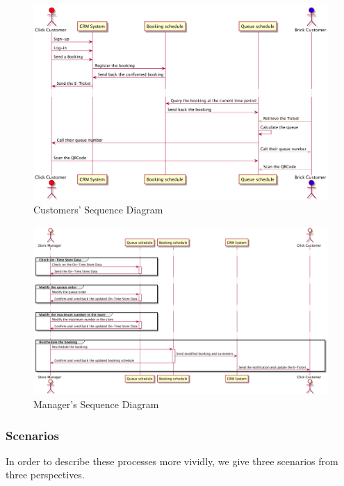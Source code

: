 \documentclass[a4paper,12pt]{report}
\begin{document}
\begin{figure}
	\includegraphics[scale=0.22]{sequence_diagram_customer.png}
	\centering
	\caption{Customers' Sequence Diagram}
	\label{Sequence Diagram Customer}
\end{figure}

\begin{figure}
	\includegraphics[scale=0.18]{sequence_diagram_manager.png}
	\centering
	\caption{Manager's Sequence Diagram}
	\label{Sequence Diagram Manager}
\end{figure}


\subsubsection{Scenarios}

In order to describe these processes more vividly, we give three scenarios from three perspectives. 
\end{document}
